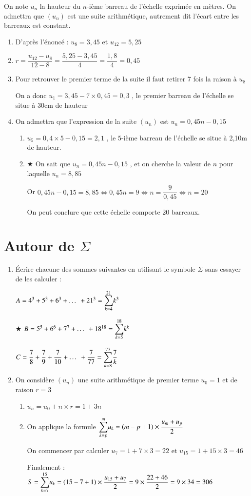 \documentclass[oneside,12pt]{exam}          %
\begin{document}
On note $u_n$ la hauteur du $n$-ième barreau de l'échelle exprimée en mètres. On admettra que $(u_n)$ est une suite arithmétique, autrement dit l'écart entre les barreaux est constant.
\begin{enumerate}[itemsep = 0pt]
	\item D'après l'énoncé : $u_8 = 3,45$ et $u_{12} = 5,25$
	\item $r = \dfrac{u_{12}-u_8}{12-8} = \dfrac{5,25 - 3,45}{4} = \dfrac{1,8}{4} = 0,45$
	\item Pour retrouver le premier terme de la suite il faut retirer 7 fois la raison à $u_8$
	
	On a donc $u_1 = 3,45 - 7 \times 0,45 = 0,3$ , le premier barreau de l'échelle se situe à 30cm de hauteur
	\item On admettra que l'expression de la suite $(u_n)$ est $u_n = 0,45n - 0,15$
	\begin{enumerate}
		\item $u_5 = 0,4 \times 5 - 0,15 = 2,1$ , le $5$-ième barreau de l'échelle se situe à 2,10m de hauteur.
		\item $\bigstar$ On sait que $u_n = 0,45n - 0,15$ , et on cherche la valeur de $n$ pour laquelle $u_n = 8,85$
		
		Or $0,45n - 0,15 = 8,85 \iff 0,45n = 9 \iff n = \dfrac{9}{0,45} \iff n = 20$
		
		On peut conclure que cette échelle comporte 20 barreaux.
	\end{enumerate}
\end{enumerate}



\section{Autour de $\Sigma$}
\begin{enumerate}[itemsep = 0pt]
	\item Écrire chacune des sommes suivantes en utilisant le symbole $\Sigma$ sans essayer de les calculer :

		$A = 4^3 + 5^3 + 6^3 + \ldots + 21^3 = \sommek{4}{21} k^3$ 
		
		$\bigstar$ $B = 5^5 + 6^6 + 7^7 + \ldots + 18^{18} = \sommek{5}{18} k^k$ 
		
		$C = \dfrac{7}{8} + \dfrac{7}{9} + \dfrac{7}{10} + \ldots + \dfrac{7}{77} = \sommek{8}{77} \dfrac{7}{k}$
	
	\item On considère $(u_n)$ une suite arithmétique de premier terme $u_0 = 1$ et de raison $r = 3$
	\begin{enumerate}
		\item $u_n = u_0 + n\times r = 1 + 3n$
		\item On applique la formule ${\displaystyle\sum_{k=p}^{m}} u_k = (m-p+1) \times \dfrac{u_m + u_p}{2}$
		
		On commencer par calculer $u_7 = 1 + 7\times 3 = 22$ et $u_15 = 1+ 15 \times 3 = 46$
		
		Finalement : $S = {\displaystyle\sum_{k=7}^{15}} u_k = (15-7+1) \times \dfrac{u_{15} + u_7}{2} = 9 \times \dfrac{22 + 46}{2} = 9 \times 34 = 306$
	\end{enumerate}
\end{enumerate}
\end{document}
